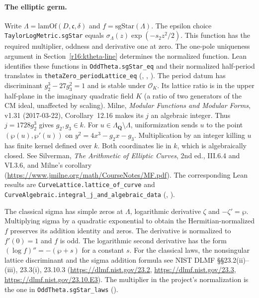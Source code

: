 \paragraph{The elliptic germ.}
Write $\Lambda=\mathrm{lamOf}(D,\mathfrak c,\delta)$ and $f=\mathrm{sgStar}(\Lambda)$.
The epsilon choice \nolinkurl{TaylorLogMetric.sgStar} equals
$\sigma_\Lambda(z)\exp(-s_2z^2/2)$. This function has the required
multiplier, oddness and derivative one at zero. The one-pole
uniqueness argument in Section~\ref{r16:ktheta-line} determines the
normalized function.
Lean identifies these functions in \nolinkurl{OddTheta.sgStar_eq} and
their normalized half-period translates in \nolinkurl{thetaZero_periodLattice_eq}
(,
,
).
The period datum has discriminant $g_2^3-27g_3^2=1$ and is stable under
$\mathcal O_K$. Its lattice ratio is in the upper half-plane in the
imaginary quadratic field $K$ (a ratio of two generators of the CM ideal,
unaffected by scaling). Milne, \emph{Modular Functions and Modular Forms},
v1.31 (2017-03-22), Corollary~12.16 makes its $j$ an algebraic integer. Thus
$j=1728g_2^3$ gives $g_2,g_3\in k$. For $u\in\Lambda_{\mathbf Q}\setminus\Lambda$,
uniformization sends $u$ to the point $(\wp(u),\wp'(u))$ on
$y^2=4x^3-g_2x-g_3$. Multiplication by an integer killing $u$ has
finite kernel defined over $k$. Both coordinates lie in $k$, which
is algebraically closed. See Silverman, \emph{The Arithmetic of Elliptic
Curves}, 2nd ed., III.6.4 and VI.3.6, and Milne's corollary
(\url{https://www.jmilne.org/math/CourseNotes/MF.pdf}).
The corresponding Lean results are \nolinkurl{CurveLattice.lattice_of_curve}
and \nolinkurl{CurveAlgebraic.integral_j_and_algebraic_data}
(,
).

The classical sigma has simple zeros at $\Lambda$, logarithmic derivative
$\zeta$ and $-\zeta'=\wp$. Multiplying sigma by a quadratic exponential
to obtain the Hermitian-normalized $f$ preserves its addition identity
and zeros. The derivative is normalized to $f'(0)=1$ and $f$ is odd.
The logarithmic second derivative has the form
$(\log f)''=-(\wp+s)$ for a constant $s$.
For the classical laws, the nonsingular lattice discriminant and the
sigma addition formula see NIST DLMF \S\S23.2(ii)--(iii), 23.3(i),
23.10.3 (\url{https://dlmf.nist.gov/23.2},
\url{https://dlmf.nist.gov/23.3}, \url{https://dlmf.nist.gov/23.10.E3}).
The multiplier in the project's normalization is the one in
\nolinkurl{OddTheta.sgStar_laws} ().

